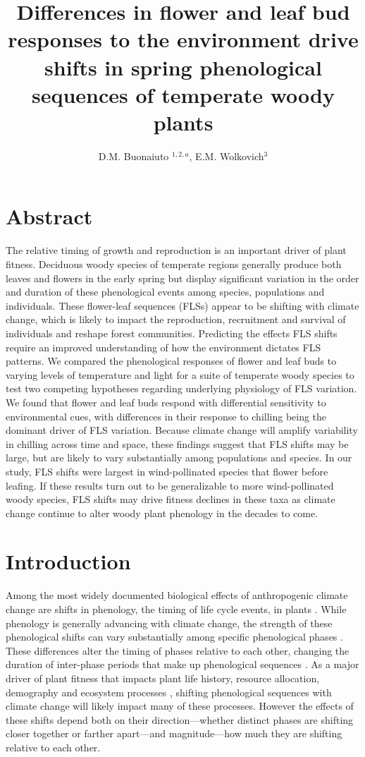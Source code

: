 \documentclass[11pt]{article}\usepackage[]{graphicx}\usepackage[]{color}
\title{Differences in flower and leaf bud responses to the environment drive shifts in spring phenological sequences of temperate woody plants}\\%
\date{}
\author{D.M. Buonaiuto $^{1,2,a}$, E.M. Wolkovich$^{3}$}
\begin{document}
\maketitle
\section*{Abstract} 
The relative timing of growth and reproduction is an important driver of plant fitness. Deciduous woody species of temperate regions generally produce both leaves and flowers in the early spring but display significant variation in the order and duration of these phenological events among species, populations and individuals. These flower-leaf sequences (FLSs) appear to be shifting with climate change, which is likely to impact the reproduction, recruitment and survival of individuals and reshape forest communities. Predicting the effects FLS shifts require an improved understanding of how the environment dictates FLS patterns. We compared the phenological responses of flower and leaf buds to varying levels of temperature and light for a suite of temperate woody species to test two competing hypotheses regarding underlying physiology of FLS variation. We found that flower and leaf buds respond with differential sensitivity to environmental cues, with differences in their response to chilling being the dominant driver of FLS variation. Because climate change will amplify variability in chilling across time and space, these findings suggest that FLS shifts may be large, but are likely to vary substantially among populations and species. In our study, FLS shifts were largest in wind-pollinated species that flower before leafing. If these results turn out to be generalizable to more wind-pollinated woody species, FLS shifts may drive fitness declines in these taxa as climate change continue to alter woody plant phenology in the decades to come.   

\section*{Introduction}
\noindent Among the most widely documented biological effects of anthropogenic climate change are shifts in phenology, the timing of life cycle events, in plants \citep{Parmesan2003,Menzel2006,Cleland2007}. While phenology is generally advancing with climate change, the strength of these phenological shifts can vary substantially among specific phenological phases \citep{Augspurger:2020aa}. These differences alter the timing of phases relative to each other, changing the duration of inter-phase periods that make up phenological sequences \citep{Ettinger2018}. As a major driver of plant fitness that impacts plant life history, resource allocation, demography and ecosystem processes \citep{Post:2008aa}, shifting phenological sequences with climate change will likely impact many of these processes. However the effects of these shifts depend both on their direction---whether distinct phases are shifting closer together or farther apart---and magnitude---how much they are shifting relative to each other.\\ 
\end{document}
